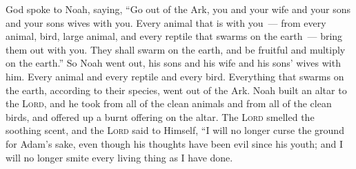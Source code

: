 \begin{inparaenum}
   God spoke to Noah, saying,%
   ``Go out of the Ark, you and your wife and your sons and your sons wives with you.%
   Every animal that is with you~--- from every animal, bird, large animal, and every reptile that swarms on the earth~--- bring them out with you. They shall swarm on the earth, and be fruitful and multiply on the earth.''%
   So Noah went out, his sons and his wife and his sons' wives with him.%
   Every animal and every reptile and every bird. Everything that swarms on the earth, according to their species, went out of the Ark.%
   Noah built an altar to the \textsc{Lord}, and he took from all of the clean animals and from all of the clean birds, and offered up a burnt offering on the altar.%
   The \textsc{Lord} smelled the soothing scent, and the \textsc{Lord} said to Himself, ``I will no longer curse the ground for Adam's sake, even though his thoughts have been evil since his youth; and I will no longer smite every living thing as I have done.%
  
  
\end{inparaenum}
